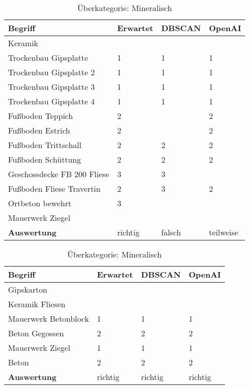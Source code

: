 \begin{table}[h]
	
	\centering
	\begin{tabular}{|l|l|l|l|}
		\hline
		\textbf{Begriff} & \textbf{Erwartet} & \textbf{DBSCAN} & \textbf{OpenAI}\\ \hline
		 Keramik & ~ & ~ & ~ \\ \hline
		 Trockenbau Gipsplatte & 1 & 1 & 1 \\ \hline
		 Trockenbau Gipsplatte 2 & 1 & 1 & 1 \\ \hline
		 Trockenbau Gipsplatte 3 & 1 & 1 & 1 \\ \hline
		 Trockenbau Gipsplatte 4 & 1 & 1 & 1 \\ \hline
		 Fußboden Teppich & 2 & ~ & 2 \\ \hline
		 Fußboden Estrich & 2 & ~ & 2 \\ \hline
		 Fußboden Trittschall & 2 & 2 & 2 \\ \hline
		 Fußboden Schüttung & 2 & 2 & 2 \\ \hline
		 Geschossdecke FB 200 Fliese & 3 & 3 & ~ \\ \hline
		 Fußboden Fliese Travertin & 2 & 3 & 2 \\ \hline
		 Ortbeton bewehrt & 3 & ~ & ~ \\ \hline
		 Mauerwerk Ziegel \\ \hline
		\textbf{Auswertung} & richtig & falsch & teilweise \\ \hline
	\end{tabular}
	\caption{Überkategorie: Mineralisch}
	\label{t:evaluation-example2}
\end{table}

\begin{table}[h]
	
	\centering
	\begin{tabular}{|l|l|l|l|}
		\hline
		\textbf{Begriff} & \textbf{Erwartet} & \textbf{DBSCAN} & \textbf{OpenAI}\\ \hline
      	Gipskarton & ~ & ~ & ~ \\ \hline
		Keramik Fliesen & ~ & ~ & ~ \\ \hline
		Mauerwerk Betonblock & 1 & 1 & 1 \\ \hline
		Beton Gegossen & 2 & 2 & 2 \\ \hline
		Mauerwerk Ziegel & 1 & 1 & 1 \\ \hline
		Beton & 2 & 2 & 2 \\ \hline	
		\textbf{Auswertung} & richtig & richtig & richtig \\ \hline
	\end{tabular}
	\caption{Überkategorie: Mineralisch}
	\label{t:evaluation-example3}
\end{table}

